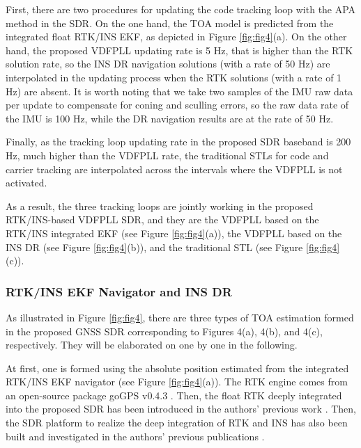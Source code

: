 \documentclass{article}
\newcommand{\reffig}[1]{Figure \ref{#1}}
\begin{document}
\noindent 

First, there are two procedures for updating the code tracking loop with the APA method in the SDR. On the one hand, the TOA model is predicted from the integrated float RTK/INS EKF, as depicted in \reffig{fig:fig4}(a). On the other hand, the proposed VDFPLL updating rate is 5 Hz, that is higher than the RTK solution rate, so the INS DR navigation solutions (with a rate of 50 Hz) are interpolated in the updating process when the RTK solutions (with a rate of 1 Hz) are absent. It is worth noting that we take two samples of the IMU raw data per update to compensate for coning and sculling errors, so the raw data rate of the IMU is 100 Hz, while the DR navigation results are at the rate of 50 Hz. 

Finally, as the tracking loop updating rate in the proposed SDR baseband is 200 Hz, much higher than the VDFPLL rate, the traditional STLs for code and carrier tracking are interpolated across the intervals where the VDFPLL is not activated. 

As a result, the three tracking loops are jointly working in the proposed RTK/INS-based VDFPLL SDR, and they are the VDFPLL based on the RTK/INS integrated EKF (see \reffig{fig:fig4}(a)), the VDFPLL based on the INS DR (see \reffig{fig:fig4}(b)), and the traditional STL (see \reffig{fig:fig4}(c)). 



\subsubsection{RTK/INS EKF Navigator and INS DR }
As illustrated in \reffig{fig:fig4}, there are three types of TOA estimation formed in the proposed GNSS SDR corresponding to Figures 4(a), 4(b), and 4(c), respectively. They will be elaborated on one by one in the following.

At first, one is formed using the absolute position estimated from the integrated RTK/INS EKF navigator (see \reffig{fig:fig4}(a)). The RTK engine comes from an open-source package goGPS v0.4.3 \cite{Herrera2016}. Then, the float RTK deeply integrated into the proposed SDR has been introduced in the authors' previous work \cite{Luo2022aa}. Then, the SDR platform to realize the deep integration of RTK and INS has also been built and investigated in the authors' previous publications \cite{Luo2019,Luo2021utc}. 
\end{document}
